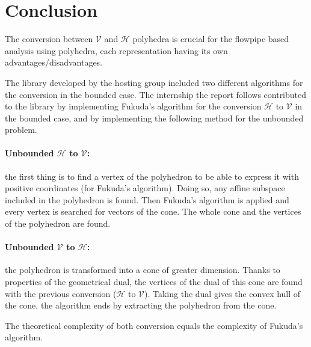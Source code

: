\section{Conclusion}
\label{section_conclusion}
The conversion between $\mathcal{V}$ and $\mathcal{H}$ polyhedra is crucial for the flowpipe based analysis using polyhedra, each representation having its own advantages/disadvantages.

The library developed by the hosting group included two different algorithms for the conversion in the bounded case. The internship the report follows contributed to the library by implementing Fukuda's algorithm for the conversion $\mathcal{H}$ to $\mathcal{V}$ in the bounded case, and by implementing the following method for the unbounded problem.

\paragraph{Unbounded $\mathcal{H}$ to $\mathcal{V}$:} the first thing is to find a vertex of the polyhedron to be able to express it with positive coordinates (for Fukuda's algorithm). Doing so, any affine subspace included in the polyhedron is found. Then Fukuda's algorithm is applied and every vertex is searched for vectors of the cone. The whole cone and the vertices of the polyhedron are found. 

\paragraph{Unbounded $\mathcal{V}$ to $\mathcal{H}$:} the polyhedron is transformed into a cone of greater dimension. Thanks to properties of the geometrical dual, the vertices of the dual of this cone are found with the previous conversion ($\mathcal{H}$ to $\mathcal{V}$). Taking the dual gives the convex hull of the cone, the algorithm ends by extracting the polyhedron from the cone.

The theoretical complexity of both conversion equals the complexity of Fukuda's algorithm.